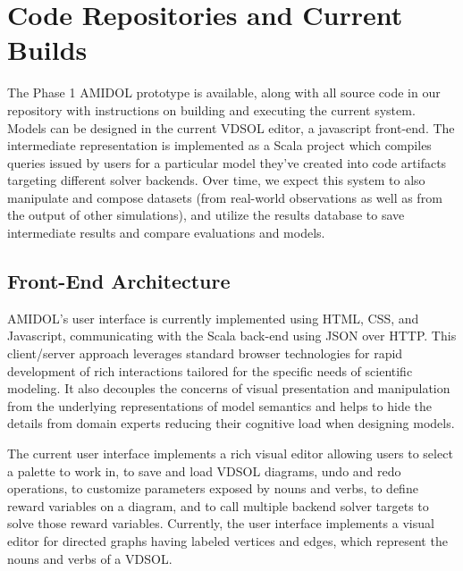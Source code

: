 \documentclass[11pt]{article}
\newcommand{\amidol}{\textsc{AMIDOL}}
\begin{document}
\section{Code Repositories and Current Builds}

The Phase 1 \amidol{} prototype is available, along with all source code in our repository with instructions on building and executing the current system.  Models can be designed in the current VDSOL editor, a javascript front-end.  The intermediate representation is implemented as a Scala project which compiles queries issued by users for a particular model they've created into code artifacts targeting different solver backends. Over time, we expect this system to also manipulate and compose datasets (from real-world observations as well as from the output of other simulations), and utilize the results database to save intermediate results and compare evaluations and models.

\subsection{Front-End Architecture}

\amidol{}'s user interface is currently implemented using HTML, CSS, and Javascript, communicating with the Scala back-end using JSON over HTTP.  This client/server approach leverages standard browser technologies for rapid development of rich interactions tailored for the specific needs of scientific modeling. It also decouples the concerns of visual presentation and manipulation from the underlying representations of model semantics and helps to hide the details from domain experts reducing their cognitive load when designing models.

The current user interface implements a rich visual editor allowing users to select a palette to work in, to save and load VDSOL diagrams, undo and redo operations, to customize parameters exposed by nouns and verbs, to define reward variables on a diagram, and to call multiple backend solver targets to solve those reward variables.
Currently, the user interface implements a visual editor for directed graphs having labeled vertices and edges, which represent the nouns and verbs of a VDSOL.
\end{document}
